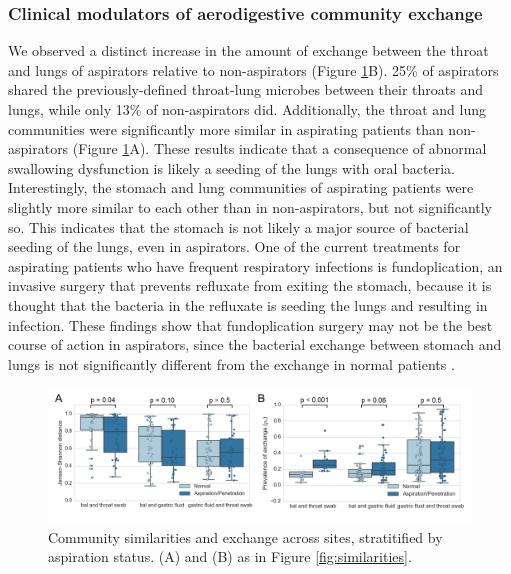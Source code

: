 \documentclass[12pt]{article}
\begin{document}
\subsubsection{Clinical modulators of aerodigestive community exchange}

We observed a distinct increase in the amount of exchange between the 
throat and lungs of aspirators relative to non-aspirators (Figure \ref{fig:aspirators}B).
25\% of aspirators shared
the previously-defined throat-lung microbes between their throats and lungs, while only 13\% of 
non-aspirators did. Additionally, the throat and lung communities
were significantly more similar in aspirating patients than non-aspirators (Figure \ref{fig:aspirators}A). These results indicate that a consequence of abnormal swallowing
dysfunction is likely a seeding of the lungs with oral bacteria.
Interestingly, the stomach and lung communities of aspirating
patients were slightly more similar to each other than in non-aspirators, but not significantly so.
This indicates that the stomach is not likely a major source
of bacterial seeding of the lungs, even in aspirators. One of the current treatments for
aspirating patients who have frequent respiratory infections is fundoplication,
an invasive surgery that prevents refluxate from exiting the stomach, because it is thought
that the bacteria in the refluxate is seeding the lungs
and resulting in infection.
These findings show that fundoplication surgery may not be the best course of action in aspirators, since 
the bacterial exchange between stomach and lungs is not
significantly different from the exchange in normal patients \cite{debenedictis-asp_dis-2009, kawahara-fundo-2004}.

\begin{figure}[h]
\begin{center}
	\includegraphics[scale=0.65]{aspiration}
	\caption{Community similarities and exchange across sites, stratitified by aspiration status.
	(A) and (B) as in Figure \ref{fig:similarities}.}
	\label{fig:aspirators}
\end{center}
\end{figure}
\end{document}
